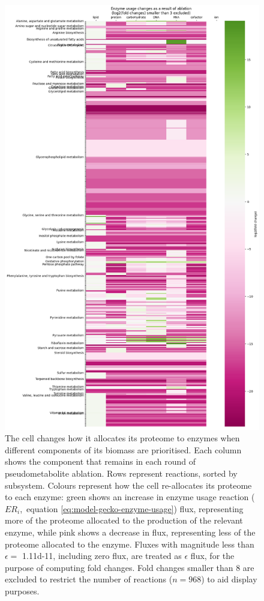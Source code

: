 \begin{figure}
  \centering
  \includegraphics[width=.8\linewidth]{div0_epsilon}
  \caption{
    The cell changes how it allocates its proteome to enzymes when different components of its biomass are prioritised.
    Each column shows the component that remains in each round of pseudometabolite ablation.
    Rows represent reactions, sorted by subsystem.
    Colours represent how the cell re-allocates its proteome to each enzyme: green shows an increase in enzyme usage reaction ($ER_{i}$,~equation \ref{eq:model-gecko-enzyme-usage}) flux, representing more of the proteome allocated to the production of the relevant enzyme, while pink shows a decrease in flux, representing less of the proteome allocated to the enzyme.
    Fluxes with magnitude less than $\epsilon = $ \SI{1.11d-11}{\mmolgdw}, including zero flux, are treated as $\epsilon$ flux, for the purpose of computing fold changes.
    Fold changes smaller than 8 are excluded to restrict the number of reactions ($n = 968$) to aid display purposes.
  }
  \label{fig:model-ablate-enz-use}
\end{figure}

